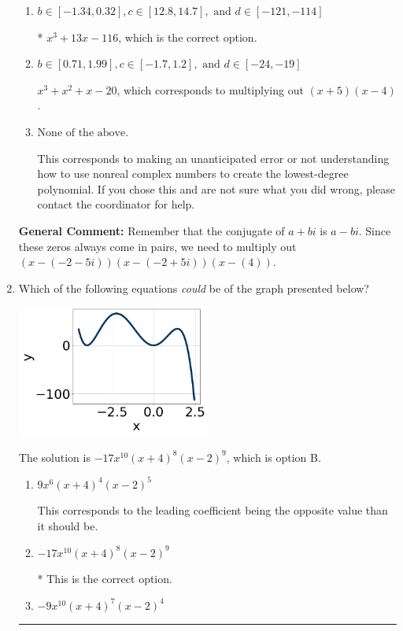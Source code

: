 \documentclass{extbook}[14pt]
\newcommand{\litem}[1]{\item #1

\rule{\textwidth}{0.4pt}}
\begin{document}
\begin{enumerate}
{\begin{enumerate}[label=\Alph*.]
$x^{3} + x^{2} -2 x -8$, which corresponds to multiplying out $(x + 2)(x -4)$.
\item \( b \in [-1.34, 0.32], c \in [12.8, 14.7], \text{ and } d \in [-121, -114] \)

* $x^{3} +13 x -116$, which is the correct option.
\item \( b \in [0.71, 1.99], c \in [-1.7, 1.2], \text{ and } d \in [-24, -19] \)

$x^{3} + x^{2} +x -20$, which corresponds to multiplying out $(x + 5)(x -4)$.
\item \( \text{None of the above.} \)

This corresponds to making an unanticipated error or not understanding how to use nonreal complex numbers to create the lowest-degree polynomial. If you chose this and are not sure what you did wrong, please contact the coordinator for help.
\end{enumerate}

\textbf{General Comment:} Remember that the conjugate of $a+bi$ is $a-bi$. Since these zeros always come in pairs, we need to multiply out $(x-(-2 - 5 i))(x-(-2 + 5 i))(x-(4))$.
}
\litem{
Which of the following equations \textit{could} be of the graph presented below?

\begin{center}
    \includegraphics[width=0.5\textwidth]{../Figures/polyGraphToFunctionCopyC.png}
\end{center}



The solution is \( -17x^{10} (x + 4)^{8} (x - 2)^{9} \), which is option B.\begin{enumerate}[label=\Alph*.]
\item \( 9x^{6} (x + 4)^{4} (x - 2)^{5} \)

This corresponds to the leading coefficient being the opposite value than it should be.
\item \( -17x^{10} (x + 4)^{8} (x - 2)^{9} \)

* This is the correct option.
\item \( -9x^{10} (x + 4)^{7} (x - 2)^{4} \)


\end{enumerate}}
\end{enumerate}
\end{document}
